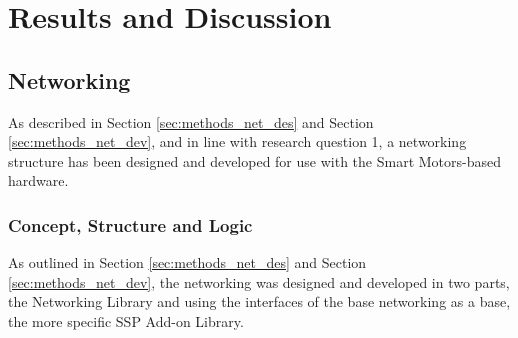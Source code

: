 \cleardoublepage%
\chapter{\label{chap:res}Results and Discussion}%


\section{\label{sec:res_networking}Networking}%

As described in Section \ref{sec:methods_net_des} and Section \ref{sec:methods_net_dev}, and in line with research question 1, a networking structure has been designed and developed for use with the Smart Motors-based hardware.

\subsection{\label{sec:res_logic}Concept, Structure and Logic}

As outlined in Section \ref{sec:methods_net_des} and Section \ref{sec:methods_net_dev}, the networking was designed and developed in two parts, the Networking Library and using the interfaces of the base networking as a base, the more specific SSP Add-on Library. \\

